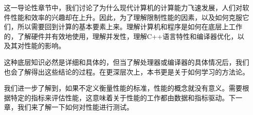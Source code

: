 这一导论性章节中，我们讨论了为什么现代计算机的计算能力飞速发展，人们对软件性能和效率的兴趣却在上升。因此，为了理解限制性能的因素，以及如何克服它们，所以需要回到计算的基本要素上来。理解计算机和程序是如何在底层上工作的，了解硬件并有效地使用，理解并发性，理解C++语言特性和编译器优化，以及其对性能的影响。

这种底层知识必然是详细和具体的，但当了解处理器或编译器的具体情况后，我们也会了解得出这些结论的过程。在更深层次上，本书更是关于如何学习的方法论。

我们进一步了解到，如果不定义衡量性能的标准，性能的概念就没有意义。需要根据特定的指标来评估性能，这意味着关于性能的工作都由数据和指标驱动。下一章，我们来了解一下如何对性能进行测试。